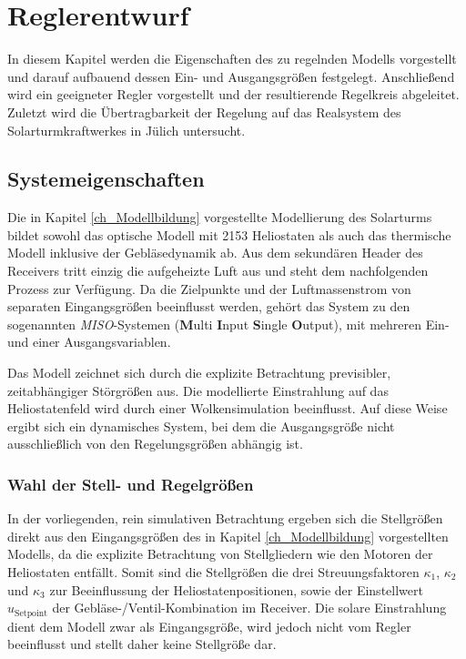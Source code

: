 \chapter{Reglerentwurf} \label{ch_Reglerentwurf}
In diesem Kapitel werden die Eigenschaften des zu regelnden Modells vorgestellt und darauf aufbauend dessen Ein- und Ausgangsgrößen festgelegt.
Anschließend wird ein geeigneter Regler vorgestellt und der resultierende Regelkreis abgeleitet.
Zuletzt wird die Übertragbarkeit der Regelung auf das Realsystem des Solarturmkraftwerkes in Jülich untersucht.

\section{Systemeigenschaften} \label{sec_Systemeigenschaften}
Die in Kapitel \ref{ch_Modellbildung} vorgestellte Modellierung des Solarturms bildet sowohl das optische Modell mit 2153 Heliostaten als auch das thermische Modell inklusive der Gebläsedynamik ab.
Aus dem sekundären Header des Receivers tritt einzig die aufgeheizte Luft aus und steht dem nachfolgenden Prozess zur Verfügung.
Da die Zielpunkte und der Luftmassenstrom von separaten Eingangsgrößen beeinflusst werden, gehört das System zu den sogenannten \mbox{\textit{MISO}-Systemen} (\textbf{M}ulti \textbf{I}nput \textbf{S}ingle \textbf{O}utput), mit mehreren Ein- und einer Ausgangsvariablen.

Das Modell zeichnet sich durch die explizite Betrachtung previsibler, zeitabhängiger Störgrößen aus.
Die modellierte Einstrahlung auf das Heliostatenfeld wird durch einer Wolkensimulation beeinflusst.
Auf diese Weise ergibt sich ein dynamisches System, bei dem die Ausgangsgröße nicht ausschließlich von den Regelungsgrößen abhängig ist.


\subsection{Wahl der Stell- und Regelgrößen} \label{subsec_EinAusgangsgrößen}
In der vorliegenden, rein simulativen Betrachtung ergeben sich die Stellgrößen direkt aus den Eingangsgrößen des in Kapitel \ref{ch_Modellbildung} vorgestellten Modells, da die explizite Betrachtung von Stellgliedern wie den Motoren der Heliostaten entfällt.
Somit sind die Stellgrößen die drei Streuungsfaktoren $\kappa_1$, $\kappa_2$ und $\kappa_3$ zur Beeinflussung der Heliostatenpositionen, sowie der Einstellwert $u_{\mathrm{Setpoint}}$ der Gebläse-/Ventil-Kombination im Receiver.
Die solare Einstrahlung dient dem Modell zwar als Eingangsgröße, wird jedoch nicht vom Regler beeinflusst und stellt daher keine Stellgröße dar.

